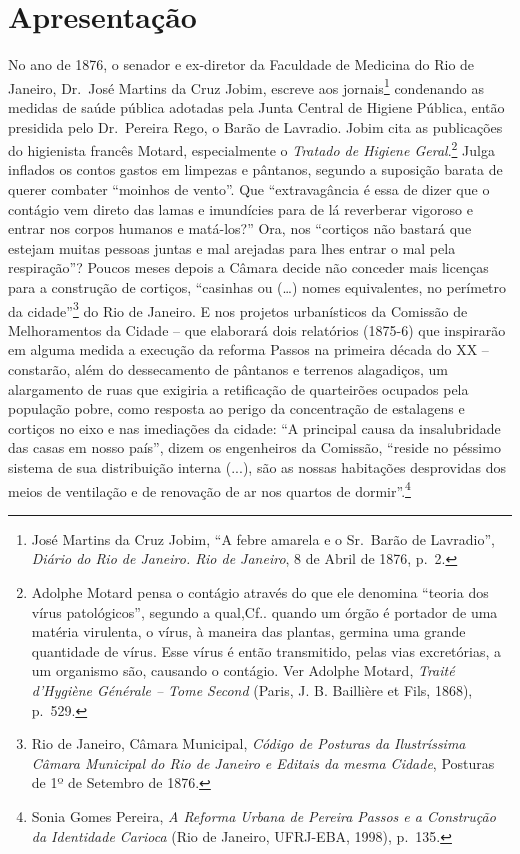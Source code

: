 \hypertarget{apresentauxe7uxe3o}{%
\chapter{Apresentação}\label{apresentauxe7uxe3o}}

No ano de 1876, o senador e ex-diretor da Faculdade de Medicina do Rio
de Janeiro, Dr.~José Martins da Cruz Jobim, escreve aos
jornais\footnote{José Martins da Cruz Jobim, ``A febre amarela e o
  Sr.~Barão de Lavradio'', \emph{Diário do Rio de Janeiro. Rio de
  Janeiro}, 8 de Abril de 1876, p.~2.} condenando as medidas de saúde
pública adotadas pela Junta Central de Higiene Pública, então presidida
pelo Dr.~Pereira Rego, o Barão de Lavradio. Jobim cita as publicações do
higienista francês Motard, especialmente o \emph{Tratado de Higiene
Geral}.\footnote{Adolphe Motard pensa o contágio através do que ele
  denomina ``teoria dos vírus patológicos'', segundo a qual,Cf.. quando
  um órgão é portador de uma matéria virulenta, o vírus, à maneira das
  plantas, germina uma grande quantidade de vírus. Esse vírus é então
  transmitido, pelas vias excretórias, a um organismo são, causando o
  contágio. Ver Adolphe Motard, \emph{Traité d'Hygiène Générale -- Tome
  Second} (Paris, J. B. Baillière et Fils, 1868), p.~529.} Julga
inflados os contos gastos em limpezas e pântanos, segundo a suposição
barata de querer combater ``moinhos de vento''. Que ``extravagância é
essa de dizer que o contágio vem direto das lamas e imundícies para de
lá reverberar vigoroso e entrar nos corpos humanos e matá-los?'' Ora,
nos ``cortiços não bastará que estejam muitas pessoas juntas e mal
arejadas para lhes entrar o mal pela respiração''? Poucos meses depois a
Câmara decide não conceder mais licenças para a construção de cortiços,
``casinhas ou (\ldots{}) nomes equivalentes, no perímetro da
cidade''\footnote{Rio de Janeiro, Câmara Municipal, \emph{Código de
  Posturas da Ilustríssima Câmara Municipal do Rio de Janeiro e Editais
  da mesma Cidade}, Posturas de 1º de Setembro de 1876.} do Rio de
Janeiro. E nos projetos urbanísticos da Comissão de Melhoramentos da
Cidade -- que elaborará dois relatórios (1875-6) que inspirarão em
alguma medida a execução da reforma Passos na primeira década do XX --
constarão, além do dessecamento de pântanos e terrenos alagadiços, um
alargamento de ruas que exigiria a retificação de quarteirões ocupados
pela população pobre, como resposta ao perigo da concentração de
estalagens e cortiços no eixo e nas imediações da cidade: ``A principal
causa da insalubridade das casas em nosso país'', dizem os engenheiros
da Comissão, ``reside no péssimo sistema de sua distribuição interna
(...), são as nossas habitações desprovidas dos meios de ventilação e de
renovação de ar nos quartos de dormir''.\footnote{Sonia Gomes Pereira,
  \emph{A Reforma Urbana de Pereira Passos e a Construção da Identidade
  Carioca} (Rio de Janeiro, UFRJ-EBA, 1998), p.~135.}

